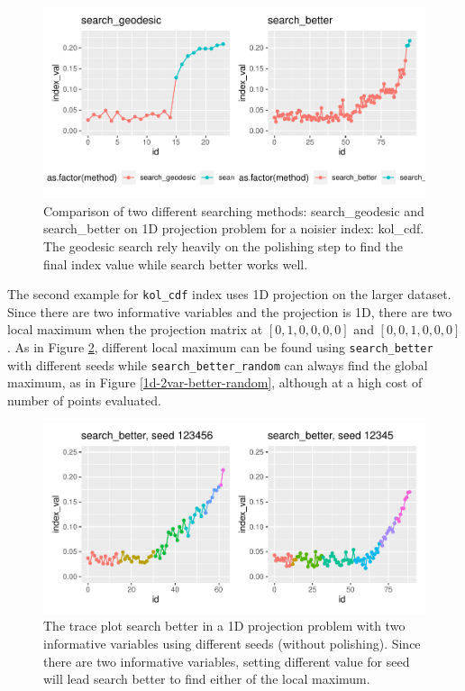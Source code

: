 \documentclass[12pt]{article}
\begin{document}
\begin{figure}
\centering
\includegraphics{paper_files/figure-latex/kol-cdf-1.pdf}
\caption{\label{kol-cdf}Comparison of two different searching methods:
search\_geodesic and search\_better on 1D projection problem for a
noisier index: kol\_cdf. The geodesic search rely heavily on the
polishing step to find the final index value while search better works
well.}
\end{figure}

The second example for \texttt{kol\_cdf} index uses 1D projection on the
larger dataset. Since there are two informative variables and the
projection is 1D, there are two local maximum when the projection matrix
at \([0, 1, 0, 0, 0, 0]\) and \([0, 0, 1 ,0, 0, 0]\). As in Figure
\ref{1d-2var-different-seeds}, different local maximum can be found
using \texttt{search\_better} with different seeds while
\texttt{search\_better\_random} can always find the global maximum, as
in Figure \ref{1d-2var-better-random}, although at a high cost of number
of points evaluated.

\begin{figure}
\centering
\includegraphics{paper_files/figure-latex/1d-2var-different-seeds-1.pdf}
\caption{\label{1d-2var-different-seeds}The trace plot search better in
a 1D projection problem with two informative variables using different
seeds (without polishing). Since there are two informative variables,
setting different value for seed will lead search better to find either
of the local maximum.}
\end{figure}
\end{document}
